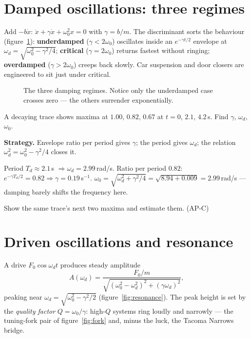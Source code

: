 \section{Damped oscillations: three regimes}\label{sec:osc-damped}

Add $-b\dot x$: $\ddot x+\gamma\dot x+\omega_0^{2}x=0$ with
$\gamma=b/m$. The discriminant sorts the behaviour
(figure~\ref{fig:damp}): \textbf{underdamped} ($\gamma<2\omega_0$)
oscillates inside an $e^{-\gamma t/2}$ envelope at
$\omega_d=\sqrt{\omega_0^{2}-\gamma^{2}/4}$; \textbf{critical}
($\gamma=2\omega_0$) returns fastest without ringing;
\textbf{overdamped} ($\gamma>2\omega_0$) creeps back slowly. Car
suspension and door closers are engineered to sit just under critical.

\begin{figure}[htbp]\centering

\caption{The three damping regimes. Notice only the underdamped case
crosses zero --- the others surrender exponentially.}
\label{fig:damp}
\end{figure}

\begin{example}\label{ex:damped}
A decaying trace shows maxima at $1.00$, $0.82$, $0.67$ at $t=0$, $2.1$,
$4.2$\,s. Find $\gamma$, $\omega_d$, $\omega_0$.
\par\smallskip
\textbf{Strategy.} Envelope ratio per period gives $\gamma$; the period
gives $\omega_d$; the relation $\omega_d^{2}=\omega_0^{2}-\gamma^{2}/4$
closes it.
\begin{solution}
Period $T_d\approx2.1$\,s $\Rightarrow\omega_d=2.99$\,rad/s.
Ratio per period $0.82$: $e^{-\gamma T_d/2}=0.82 \Rightarrow
\gamma=0.19$\,s$^{-1}$.
$\omega_0=\sqrt{\omega_d^{2}+\gamma^{2}/4}=\sqrt{8.94+0.009}=2.99$\,rad/s
--- damping barely shifts the frequency here. \checkmark
\end{solution}
\end{example}

\begin{exercise}[easy]
Show the same trace's next two maxima and estimate them. (AP-C)
\end{exercise}

\section{Driven oscillations and resonance}\label{sec:osc-driven}

A drive $F_0\cos\omega_dt$ produces steady amplitude
\begin{equation}
  A(\omega_d)=\frac{F_0/m}{\sqrt{(\omega_0^{2}-\omega_d^{2})^{2}
  +(\gamma\omega_d)^{2}}},\label{eq:amp}
\end{equation}
peaking near $\omega_d=\sqrt{\omega_0^{2}-\gamma^{2}/2}$
(figure~\ref{fig:resonance}). The peak height is set by the
\emph{quality factor} $Q=\omega_0/\gamma$: high-$Q$ systems ring loudly
and narrowly --- the tuning-fork pair of figure~\ref{fig:fork} and, minus
the luck, the Tacoma Narrows bridge.

